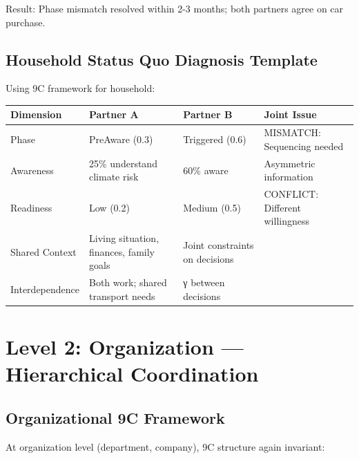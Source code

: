 Result: Phase mismatch resolved within 2-3 months; both partners agree on car purchase.

\subsection{Household Status Quo Diagnosis Template}

Using 9C framework for household:

\begin{center}
\small
\begin{tabular}{@{}llll@{}}
\toprule
\textbf{Dimension} & \textbf{Partner A} & \textbf{Partner B} & \textbf{Joint Issue} \\
\midrule
Phase & PreAware (0.3) & Triggered (0.6) & MISMATCH: Sequencing needed \\
Awareness & 25\% understand climate risk & 60\% aware & Asymmetric information \\
Readiness & Low (0.2) & Medium (0.5) & CONFLICT: Different willingness \\
Shared Context & Living situation, finances, family goals & Joint constraints on decisions \\
Interdependence & Both work; shared transport needs & γ between decisions \\
\midrule
\end{tabular}
\end{center}


\section{Level 2: Organization --- Hierarchical Coordination}
\label{sec:level2-organization}

\subsection{Organizational 9C Framework}

At organization level (department, company), 9C structure again invariant:

